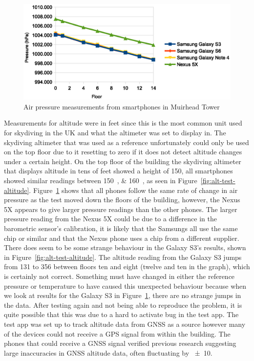 \documentclass[11pt, a4paper, twocolumn]{article}
\begin{document}
\begin{figure}[h]
    \centering
    \includegraphics{alt-test-pressure}
    \caption{Air pressure measurements from smartphones in Muirhead Tower}\label{fig:alt-test-pressure}
\end{figure}

Measurements for altitude were in feet since this is the most common unit used for skydiving in the UK and what the altimeter was set to display in. The skydiving altimeter that was used as a reference unfortunately could only be used on the top floor due to it resetting to zero if it does not detect altitude changes under a certain height. On the top floor of the building the skydiving altimeter that displays altitude in tens of feet showed a height of \SI{150}{\feet}, all smartphones showed similar readings between \SIlist{150; 160}{\feet}, as seen in Figure~\ref{fig:alt-test-altitude}.
Figure~\ref{fig:alt-test-pressure} shows that all phones follow the same rate of change in air pressure as the test moved down the floors of the building, however, the Nexus 5X appears to give larger pressure readings than the other phones. The larger pressure reading from the Nexus 5X could be due to a difference in the barometric sensor's calibration, it is likely that the Samsungs all use the same chip or similar and that the Nexus phone uses a chip from a different supplier.
There does seem to be some strange behaviour in the Galaxy S3's results, shown in Figure~\ref{fig:alt-test-altitude}. The altitude reading from the Galaxy S3 jumps from \SI{131}{\feet} to \SI{356}{\feet} between floors ten and eight (twelve and ten in the graph), which is certainly not correct. Something must have changed in either the reference pressure or temperature to have caused this unexpected behaviour because when we look at results for the Galaxy S3 in Figure~\ref{fig:alt-test-pressure}, there are no strange jumps in the data. After testing again and not being able to reproduce the problem, it is quite possible that this was due to a hard to activate bug in the test app. The test app was set up to track altitude data from GNSS as a source however many of the devices could not receive a GPS signal from within the building. The phones that could receive a GNSS signal verified previous research suggesting large inaccuracies in GNSS altitude data, often fluctuating by \SI{\pm10}{\feet}.
\end{document}
